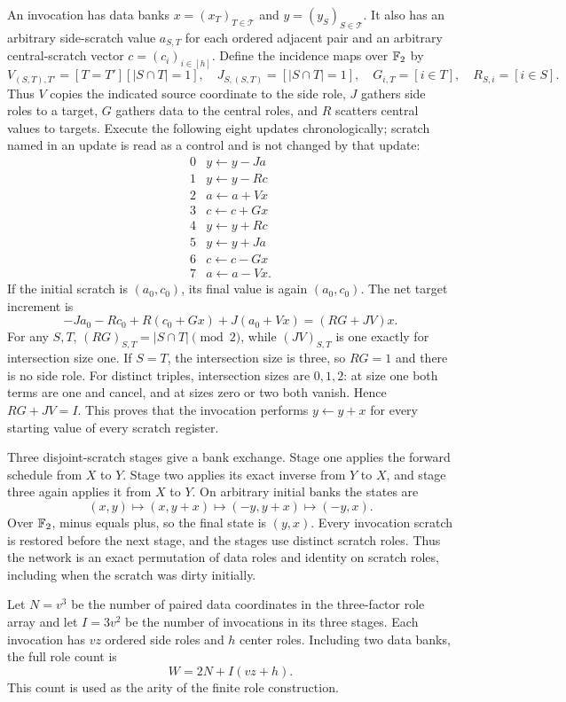 An invocation has data banks $x=(x_T)_{T\in\mathcal T}$ and $y=(y_S)_{S\in\mathcal T}$. It also has an arbitrary side-scratch value $a_{S,T}$ for each ordered adjacent pair and an arbitrary central-scratch vector $c=(c_i)_{i\in[h]}$. Define the incidence maps over $\mathbb F_2$ by
\[
 V_{(S,T),T'}=[T=T'][|S\cap T|=1],\quad
 J_{S,(S,T)}=[|S\cap T|=1],\quad
 G_{i,T}=[i\in T],\quad R_{S,i}=[i\in S].
\]
Thus $V$ copies the indicated source coordinate to the side role, $J$ gathers side roles to a target, $G$ gathers data to the central roles, and $R$ scatters central values to targets. Execute the following eight updates chronologically; scratch named in an update is read as a control and is not changed by that update:
\[
\begin{array}{c|l}
0&y\leftarrow y-Ja\\
1&y\leftarrow y-Rc\\
2&a\leftarrow a+Vx\\
3&c\leftarrow c+Gx\\
4&y\leftarrow y+Rc\\
5&y\leftarrow y+Ja\\
6&c\leftarrow c-Gx\\
7&a\leftarrow a-Vx.
\end{array}
\]
If the initial scratch is $(a_0,c_0)$, its final value is again $(a_0,c_0)$. The net target increment is
\[
 -Ja_0-Rc_0+R(c_0+Gx)+J(a_0+Vx)=(RG+JV)x.
\]
For any $S,T$, $(RG)_{S,T}=|S\cap T|\pmod 2$, while $(JV)_{S,T}$ is one exactly for intersection size one. If $S=T$, the intersection size is three, so $RG=1$ and there is no side role. For distinct triples, intersection sizes are $0,1,2$: at size one both terms are one and cancel, and at sizes zero or two both vanish. Hence $RG+JV=I$. This proves that the invocation performs $y\leftarrow y+x$ for every starting value of every scratch register.

Three disjoint-scratch stages give a bank exchange. Stage one applies the forward schedule from $X$ to $Y$. Stage two applies its exact inverse from $Y$ to $X$, and stage three again applies it from $X$ to $Y$. On arbitrary initial banks the states are
\[
 (x,y)\longmapsto(x,y+x)\longmapsto(-y,y+x)\longmapsto(-y,x).
\]
Over $\mathbb F_2$, minus equals plus, so the final state is $(y,x)$. Every invocation scratch is restored before the next stage, and the stages use distinct scratch roles. Thus the network is an exact permutation of data roles and identity on scratch roles, including when the scratch was dirty initially.

Let $N=v^3$ be the number of paired data coordinates in the three-factor role array and let $I=3v^2$ be the number of invocations in its three stages. Each invocation has $vz$ ordered side roles and $h$ center roles. Including two data banks, the full role count is
\[
 W=2N+I(vz+h).
\]
This count is used as the arity of the finite role construction.

